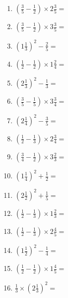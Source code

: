 \documentclass[12pt]{article}
\begin{document}
\begin{enumerate}
\item \large $ \left( \frac{3}{5} - \frac{1}{2} \right) \times 2 \frac{3}{5} = $ \vspace{1.6cm}
\item \large $ \left( \frac{3}{5} - \frac{1}{2} \right) \times 3 \frac{3}{5} = $ \vspace{1.6cm}
\item \large $ \left( 1 \frac{1}{3} \right)^2 - \frac{2}{5} = $ \vspace{1.6cm}
\item \large $ \left( \frac{1}{2} - \frac{1}{2} \right) \times 1 \frac{2}{4} = $ \vspace{1.6cm}
\item \large $ \left( 2 \frac{1}{3} \right)^2 - \frac{1}{3} = $ \vspace{1.6cm}
\newpage
\item \large $ \left( \frac{3}{5} - \frac{1}{5} \right) \times 3 \frac{3}{4} = $ \vspace{1.6cm}
\item \large $ \left( 2 \frac{1}{4} \right)^2 - \frac{3}{5} = $ \vspace{1.6cm}
\item \large $ \left( \frac{1}{2} - \frac{1}{3} \right) \times 2 \frac{3}{4} = $ \vspace{1.6cm}
\item \large $ \left( \frac{3}{4} - \frac{1}{2} \right) \times 3 \frac{2}{3} = $ \vspace{1.6cm}
\item \large $ \left( 1 \frac{1}{4} \right)^2 + \frac{1}{2} = $ \vspace{1.6cm}
\item \large $ \left( 2 \frac{1}{2} \right)^2 + \frac{1}{5} = $ \vspace{1.6cm}
\item \large $ \left( \frac{1}{2} - \frac{1}{3} \right) \times 1 \frac{2}{3} = $ \vspace{1.6cm}
\item \large $ \left( \frac{1}{2} - \frac{1}{3} \right) \times 2 \frac{4}{5} = $ \vspace{1.6cm}
\item \large $ \left( 1 \frac{1}{2} \right)^2 - \frac{1}{4} = $ \vspace{1.6cm}
\item \large $ \left( \frac{1}{2} - \frac{1}{2} \right) \times 1 \frac{4}{5} = $ \vspace{1.6cm}
\newpage
\item \large $ \frac{1}{3} \times \left( 2 \frac{1}{3} \right)^2 = $ \vspace{1.6cm}

\end{enumerate}
\end{document}
